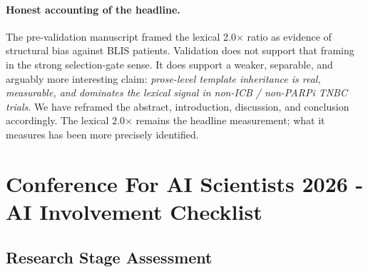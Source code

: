 \documentclass{article}
\begin{document}
\paragraph{Honest accounting of the headline.}
The pre-validation manuscript framed the lexical 2.0$\times$ ratio
as evidence of structural bias against BLIS patients.  Validation
does not support that framing in the strong selection-gate sense.
It does support a weaker, separable, and arguably more interesting
claim: \emph{prose-level template inheritance is real, measurable,
and dominates the lexical signal in non-ICB / non-PARPi TNBC
trials}.  We have reframed the abstract, introduction, discussion,
and conclusion accordingly.  The lexical 2.0$\times$ remains the
headline measurement; what it measures has been more precisely
identified.

\newpage

\section*{Conference For AI Scientists 2026 - AI Involvement Checklist}
\label{checklist_ai_involvement}

\subsection*{Research Stage Assessment}
\end{document}
